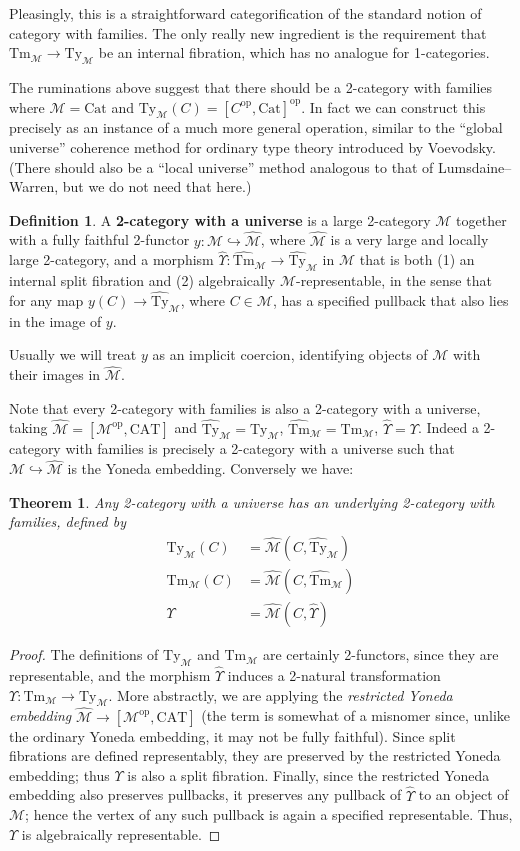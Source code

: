 \documentclass[10pt]{article}
\newtheorem{theorem}{Theorem}
\theoremstyle{definition}
\newtheorem{definition}{Definition}
\newcommand\op{^{\mathrm{op}}}
\newcommand\Cat{\mathrm{Cat}}
\newcommand\CAT{\mathrm{CAT}}
\newcommand\M{\mathcal{M}}
\newcommand\Mhat{\widehat{\mathcal{M}}}
\newcommand\Mty{{\mathrm{Ty}_{\M}}}
\newcommand\Mtm{{\mathrm{Tm}_{\M}}}
\newcommand\Mtyhat{{\widehat{\mathrm{Ty}}_{\M}}}
\newcommand\Mtmhat{{\widehat{\mathrm{Tm}}_{\M}}}
\newcommand\Ups{\Upsilon}
\newcommand\Upshat{{\widehat{\Upsilon}}}
\begin{document}
Pleasingly, this is a straightforward categorification of the standard notion of category with families.
The only really new ingredient is the requirement that $\Mtm\to \Mty$ be an internal fibration, which has no analogue for 1-categories.

The ruminations above suggest that there should be a 2-category with families where $\M=\Cat$ and $\Mty(C) = [C\op,\Cat]\op$.
In fact we can construct this precisely as an instance of a much more general operation, similar to the ``global universe'' coherence method for ordinary type theory introduced by Voevodsky.
(There should also be a ``local universe'' method analogous to that of Lumsdaine--Warren, but we do not need that here.)

\begin{definition}
  A \textbf{2-category with a universe} is a large 2-category $\M$ together with a fully faithful 2-functor $y:\M \hookrightarrow \Mhat$, where $\Mhat$ is a very large and locally large 2-category, and a morphism $\Upshat : \Mtmhat \to \Mtyhat$ in $\Mhat$ that is both (1) an internal split fibration and (2) algebraically $\M$-representable, in the sense that for any map $y(C)\to \Mtyhat$, where $C\in \M$, has a specified pullback that also lies in the image of $y$.
\end{definition}

Usually we will treat $y$ as an implicit coercion, identifying objects of $\M$ with their images in $\Mhat$.

Note that every 2-category with families is also a 2-category with a universe, taking $\Mhat = [\M\op,\CAT]$ and $\Mtyhat=\Mty$, $\Mtmhat = \Mtm$, $\Upshat = \Ups$.
Indeed a 2-category with families is precisely a 2-category with a universe such that $\M \hookrightarrow \Mhat$ is the Yoneda embedding.
Conversely we have:

\begin{theorem}\label{thm:2cwf-univ}
  Any 2-category with a universe has an underlying 2-category with families, defined by
  \begin{align*}
    \Mty(C) &= \Mhat(C,\Mtyhat)\\
    \Mtm(C) &= \Mhat(C,\Mtmhat)\\
    \Ups &= \Mhat(C,\Upshat)
  \end{align*}
\end{theorem}
\begin{proof}
  The definitions of $\Mty$ and $\Mtm$ are certainly 2-functors, since they are representable, and the morphism $\Upshat$ induces a 2-natural transformation $\Ups:\Mtm\to\Mty$.
  More abstractly, we are applying the \emph{restricted Yoneda embedding} $\Mhat \to [\M\op,\CAT]$ (the term is somewhat of a misnomer since, unlike the ordinary Yoneda embedding, it may not be fully faithful).
  Since split fibrations are defined representably, they are preserved by the restricted Yoneda embedding; thus $\Ups$ is also a split fibration.
  Finally, since the restricted Yoneda embedding also preserves pullbacks, it preserves any pullback of $\Upshat$ to an object of $\M$; hence the vertex of any such pullback is again a specified representable.
  Thus, $\Ups$ is algebraically representable.
\end{proof}
\end{document}
